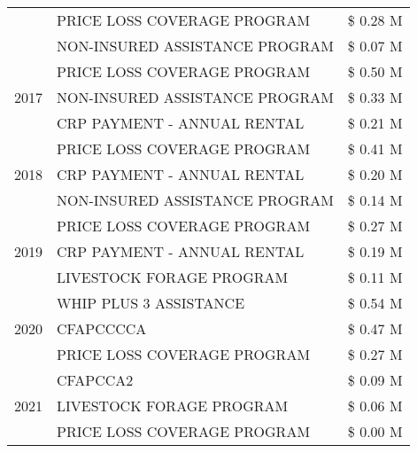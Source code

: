 \begin{tabular}{llr}
 & PRICE LOSS COVERAGE PROGRAM & \$ 0.28 M \\
 & NON-INSURED ASSISTANCE PROGRAM & \$ 0.07 M \\
\cline{1-3}
\multirow[t]{3}{*}{2017} & PRICE LOSS COVERAGE PROGRAM & \$ 0.50 M \\
 & NON-INSURED ASSISTANCE PROGRAM & \$ 0.33 M \\
 & CRP PAYMENT - ANNUAL RENTAL & \$ 0.21 M \\
\cline{1-3}
\multirow[t]{3}{*}{2018} & PRICE LOSS COVERAGE PROGRAM & \$ 0.41 M \\
 & CRP PAYMENT - ANNUAL RENTAL & \$ 0.20 M \\
 & NON-INSURED ASSISTANCE PROGRAM & \$ 0.14 M \\
\cline{1-3}
\multirow[t]{3}{*}{2019} & PRICE LOSS COVERAGE PROGRAM & \$ 0.27 M \\
 & CRP PAYMENT - ANNUAL RENTAL & \$ 0.19 M \\
 & LIVESTOCK FORAGE PROGRAM & \$ 0.11 M \\
\cline{1-3}
\multirow[t]{3}{*}{2020} & WHIP PLUS 3 ASSISTANCE & \$ 0.54 M \\
 & CFAPCCCCA & \$ 0.47 M \\
 & PRICE LOSS COVERAGE PROGRAM & \$ 0.27 M \\
\cline{1-3}
\multirow[t]{3}{*}{2021} & CFAPCCA2 & \$ 0.09 M \\
 & LIVESTOCK FORAGE PROGRAM & \$ 0.06 M \\
 & PRICE LOSS COVERAGE PROGRAM & \$ 0.00 M \\
\cline{1-3}
\bottomrule
\end{tabular}
